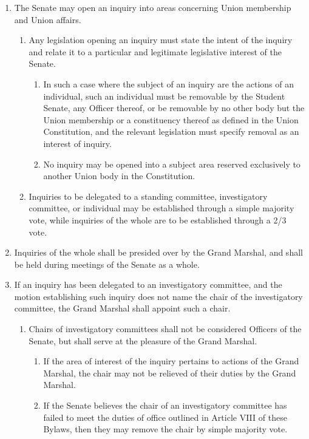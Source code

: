 
\begin{enumerate}
\item The Senate may open an inquiry into areas concerning Union membership and Union affairs.
  \begin{enumerate}
  \item Any legislation opening an inquiry must state the intent of the inquiry and relate it to a particular and legitimate legislative interest of the Senate.
    \begin{enumerate}
    \item In such a case where the subject of an inquiry are the actions of an individual, such an individual must be removable by the Student Senate, any Officer thereof, or be removable by no other body but the Union membership or a constituency thereof as defined in the Union Constitution, and the relevant legislation must specify removal as an interest of inquiry.
    \item No inquiry may be opened into a subject area reserved exclusively to another Union body in the Constitution.
    \end{enumerate}
  \item Inquiries to be delegated to a standing committee, investigatory committee, or individual may be established through a simple majority vote, while inquiries of the whole are to be established through a 2/3 vote.
  \end{enumerate}
\item Inquiries of the whole shall be presided over by the Grand Marshal, and shall be held during meetings of the Senate as a whole.
\item If an inquiry has been delegated to an investigatory committee, and the motion establishing such inquiry does not name the chair of the investigatory committee, the Grand Marshal shall appoint such a chair.
  \begin{enumerate}
  \item Chairs of investigatory committees shall not be considered Officers of the Senate, but shall serve at the pleasure of the Grand Marshal.
    \begin{enumerate}
    \item If the area of interest of the inquiry pertains to actions of the Grand Marshal, the chair may not be relieved of their duties by the Grand Marshal.
    \item If the Senate believes the chair of an investigatory committee has failed to meet the duties of office outlined in Article VIII of these Bylaws, then they may remove the chair by simple majority vote.

\end{enumerate}
\end{enumerate}
\end{enumerate}

